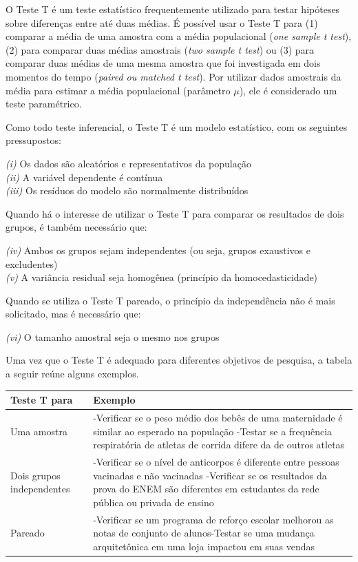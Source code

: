 \documentclass[
]{book}
\begin{document}
O Teste T é um teste estatístico frequentemente utilizado para testar hipóteses sobre diferenças entre até duas médias. É possível usar o Teste T para (1) comparar a média de uma amostra com a média populacional (\emph{one sample t test}), (2) para comparar duas médias amostrais (\emph{two sample t test}) ou (3) para comparar duas médias de uma mesma amostra que foi investigada em dois momentos do tempo (\emph{paired ou matched t test}). Por utilizar dados amostrais da média para estimar a média populacional (parâmetro \(\mu\)), ele é considerado um teste paramétrico.

Como todo teste inferencial, o Teste T é um modelo estatístico, com os seguintes pressupostos:

\emph{(i)} Os dados são aleatórios e representativos da população\\
\emph{(ii)} A variável dependente é contínua\\
\emph{(iii)} Os resíduos do modelo são normalmente distribuídos

Quando há o interesse de utilizar o Teste T para comparar os resultados de dois grupos, é também necessário que:

\emph{(iv)} Ambos os grupos sejam independentes (ou seja, grupos exaustivos e excludentes)\\
\emph{(v)} A variância residual seja homogênea (princípio da homocedasticidade)

Quando se utiliza o Teste T pareado, o princípio da independência não é mais solicitado, mas é necessário que:

\emph{(vi)} O tamanho amostral seja o mesmo nos grupos

Uma vez que o Teste T é adequado para diferentes objetivos de pesquisa, a tabela a seguir reúne alguns exemplos.

\begin{longtable}[]{@{}
  >{\raggedright\arraybackslash}p{}
  >{\raggedright\arraybackslash}p{}@{}}
\toprule
Teste T para & Exemplo \\
\midrule
\endhead
Uma amostra & -Verificar se o peso médio dos bebês de uma maternidade é similar ao esperado na população -Testar se a frequência respiratória de atletas de corrida difere da de outros atletas \\
Dois grupos independentes & -Verificar se o nível de anticorpos é diferente entre pessoas vacinadas e não vacinadas -Verificar se os resultados da prova do ENEM são diferentes em estudantes da rede pública ou privada de ensino \\
Pareado & -Verificar se um programa de reforço escolar melhorou as notas de conjunto de alunos-Testar se uma mudança arquitetônica em uma loja impactou em suas vendas \\
\bottomrule
\end{longtable}
\end{document}
